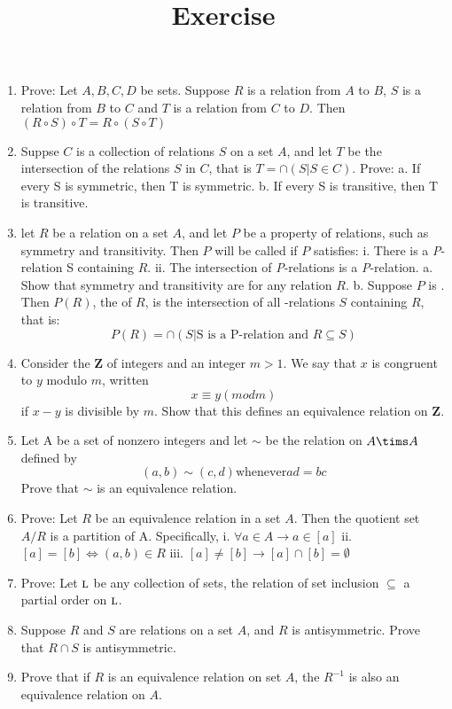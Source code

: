 \documentclass[a4paper, 12pt]{article}
\title{Exercise}
\begin{document}
\begin{enumerate}
  \item Prove: Let $A, B, C, D$ be sets. Suppose $R$ is a relation from $A$ to $B$,
  $S$ is a relation from $B$ to $C$ and $T$ is a relation from $C$ to $D$.
  Then $(R\circ S)\circ T = R\circ (S\circ T)$

  \item Suppse $C$ is a collection of relations $S$ on a set $A$,
  and let $T$ be the intersection of the relations $S$ in $C$, that is $T = \cap(S|S \in C)$.
  Prove:
  a. If every S is symmetric, then T is symmetric.
  b. If every S is transitive, then T is transitive.

  \item let $R$ be a relation on a set $A$, and let $P$ be a property of relations,
  such as symmetry and transitivity. Then $P$ will be called  if $P$ satisfies:
  i. There is a \textsl{P}-relation S containing $R$.
  ii. The intersection of \textsl{P}-relations is a \textsl{P}-relation.
  a. Show that symmetry and transitivity are  for any relation $R$.
  b. Suppose $P$ is . Then $P(R)$, the  of $R$,
  is the intersection of all -relations $S$ containing $R$, that is:
  $$
  P(R) = \cap(S | \textrm{S is a P-relation and } R \subseteq S)
  $$

  \item Consider the \textbf{Z} of integers and an integer $m > 1$.
  We say that $x$ is congruent to $y$ modulo $m$, written
  $$
  x \equiv y (mod m)
  $$
  if $x - y$ is divisible by $m$. Show that this defines an equivalence relation on \textbf{Z}.

  \item Let A be a set of nonzero integers and let $\sim$ be the relation on $A\tims A$ defined by
  $$
  (a, b) \sim (c, d) \textrm{whenever} ad = bc
  $$
  Prove that $\sim$ is an equivalence relation.

  \item Prove: Let $R$ be an equivalence relation in a set $A$. Then the quotient set $A/R$ is a partition of A.
  Specifically,
  i.   $\forall a \in A \to a\in [a]$
  ii.  $[a] = [b] \iff (a, b) \in R$
  iii. $[a] \neq [b] \to [a]\cap [b] = \emptyset$

  \item Prove: Let $\textsc{l}$ be any collection of sets,
  the relation of set inclusion $\subseteq$ a partial order on $\textsc{l}$.

  \item Suppose $R$ and $S$ are relations on a set $A$, and $R$ is antisymmetric.
  Prove that $R\cap S$ is antisymmetric.

  \item Prove that if $R$ is an equivalence relation on set $A$, the $R^{-1}$ is also an equivalence relation on $A$.

\end{enumerate}
\end{document}
